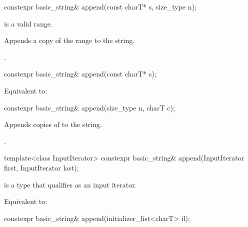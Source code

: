 %
\begin{itemdecl}
constexpr basic_string& append(const charT* s, size_type n);
\end{itemdecl}

\begin{itemdescr}
\pnum
\expects
{} is a valid range.

\pnum
\effects
Appends a copy of the range  to the string.

\pnum
\returns
{}.
\end{itemdescr}

%
\begin{itemdecl}
constexpr basic_string& append(const charT* s);
\end{itemdecl}

\begin{itemdescr}
\pnum
\effects
Equivalent to: 
\end{itemdescr}

%
\begin{itemdecl}
constexpr basic_string& append(size_type n, charT c);
\end{itemdecl}

\begin{itemdescr}
\pnum
\effects
Appends  copies of  to the string.

\pnum
\returns
{}.
\end{itemdescr}

%
\begin{itemdecl}
template<class InputIterator>
  constexpr basic_string& append(InputIterator first, InputIterator last);
\end{itemdecl}

\begin{itemdescr}
\pnum
\constraints
{} is a type that qualifies as an input
iterator.

\pnum
\effects
Equivalent to: 
\end{itemdescr}

%
\begin{itemdecl}
constexpr basic_string& append(initializer_list<charT> il);
\end{itemdecl}

